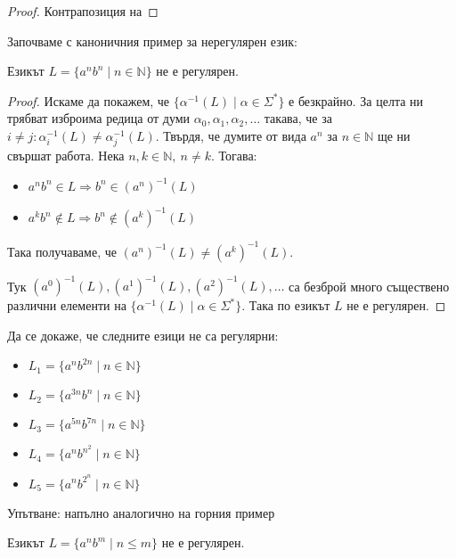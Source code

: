 \begin{proof}
    Контрапозиция на 
\end{proof}

Започваме с каноничния пример за нерегулярен език:

\begin{claim}
    Езикът $L = \{ a^nb^n \mid n \in \mathbb{N} \}$ не е регулярен.
\end{claim}

\begin{proof}
    Искаме да покажем, че $\{ \alpha^{-1}(L) \mid \alpha \in \Sigma^* \}$ е безкрайно.
    За целта ни трябват изброима редица от думи $\alpha_0, \alpha_1, \alpha_2, \dots$ такава, че за $i \neq j : \alpha_i^{-1}(L) \neq \alpha_j^{-1}(L)$.
    Твърдя, че думите от вида $a^n$ за $n \in \mathbb{N}$ ще ни свършат работа.
    Нека $n, k \in \mathbb{N}, \: n \neq k$.
    Тогава:
    \begin{itemize}
        \item $a^nb^n \in L \Rightarrow b^n \in (a^n)^{-1}(L)$
        \item $a^kb^n \notin L \Rightarrow b^n \notin (a^k)^{-1}(L)$
    \end{itemize}
    Така получаваме, че $(a^n)^{-1}(L) \neq (a^k)^{-1}(L)$.

    Тук $(a^0)^{-1}(L), (a^1)^{-1}(L), (a^2)^{-1}(L), \dots$ са безброй много съществено различни елементи на $\{ \alpha^{-1}(L) \mid \alpha \in \Sigma^* \}$.
    Така по  езикът $L$ не е регулярен.
\end{proof}

\begin{problem}
Да се докаже, че следните езици не са регулярни:
\begin{itemize}
    \item $L_1 = \{ a^nb^{2n} \mid n \in \mathbb{N} \}$
    \item $L_2 = \{ a^{3n}b^n \mid n \in \mathbb{N} \}$
    \item $L_3 = \{ a^{5n}b^{7n} \mid n \in \mathbb{N} \}$
    \item $L_4 = \{ a^nb^{n^2} \mid n \in \mathbb{N} \}$
    \item $L_5 = \{ a^nb^{2^n} \mid n \in \mathbb{N} \}$
\end{itemize}
Упътване: напълно аналогично на горния пример
\end{problem}

\begin{claim}
    Езикът $L = \{ a^nb^m \mid n \leq m \}$ не е регулярен.
\end{claim}

